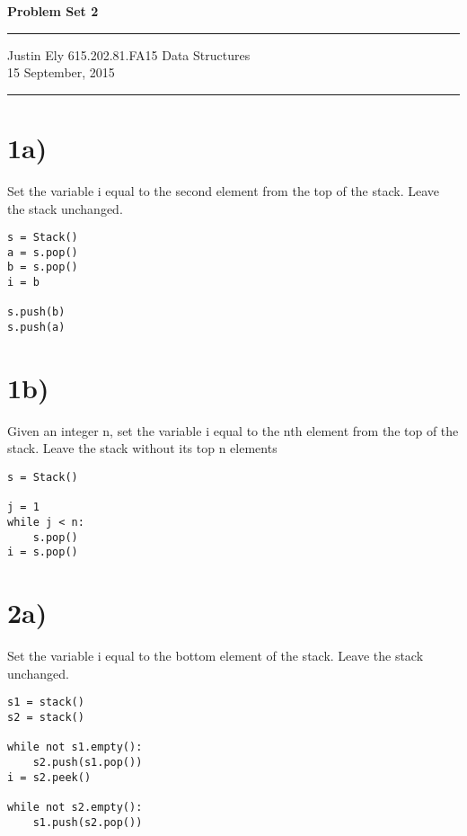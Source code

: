 \documentclass[a4paper,11pt]{article}
\begin{document}
\begin{flushright}

\vspace{1.1cm}

{\bf\Huge Problem Set 2}

\rule{0.25\linewidth}{0.5pt}

\vspace{0.5cm}
Justin Ely
\linebreak
\newline
\footnotesize{615.202.81.FA15 Data Structures \\}
\vspace{0.5cm}
15 September, 2015
\end{flushright}

\noindent\rule{\linewidth}{1.0pt}


\section*{1a)}
Set the variable i equal to the second element from the top of the stack. Leave the stack unchanged. 
\begin{verbatim}
s = Stack()
a = s.pop()
b = s.pop()
i = b

s.push(b)
s.push(a)
\end{verbatim}

\section*{1b)}
Given an integer n, set the variable i equal to the nth element from the top of the stack.  Leave the stack without its top n elements
\begin{verbatim}
s = Stack()

j = 1
while j < n:
    s.pop()
i = s.pop()
\end{verbatim}


\section*{2a)}
Set the variable i equal to the bottom element of the stack. Leave the stack unchanged. 
\begin{verbatim}
s1 = stack()
s2 = stack()

while not s1.empty():
    s2.push(s1.pop())
i = s2.peek()

while not s2.empty():
    s1.push(s2.pop())
    
\end{verbatim}
\end{document}
